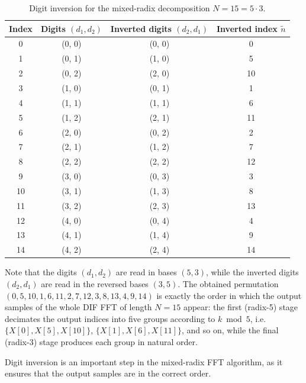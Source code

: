 \documentclass[a4paper,12pt, master]{etf}
\begin{document}
\begin{table}[H]
    \centering
    \begin{tabular}{|c|c|c|c|}
        \hline
        \textbf{Index} & \textbf{Digits $(d_1, d_2)$} & \textbf{Inverted digits $(d_2, d_1)$} & \textbf{Inverted index $\tilde{n}$} \\
        \hline
        0 & (0, 0) & (0, 0) & 0 \\
        \hline
        1 & (0, 1) & (1, 0) & 5 \\
        \hline
        2 & (0, 2) & (2, 0) & 10 \\
        \hline
        3 & (1, 0) & (0, 1) & 1 \\
        \hline
        4 & (1, 1) & (1, 1) & 6 \\
        \hline
        5 & (1, 2) & (2, 1) & 11 \\
        \hline
        6 & (2, 0) & (0, 2) & 2 \\
        \hline
        7 & (2, 1) & (1, 2) & 7 \\
        \hline
        8 & (2, 2) & (2, 2) & 12 \\
        \hline
        9 & (3, 0) & (0, 3) & 3 \\
        \hline
        10 & (3, 1) & (1, 3) & 8 \\
        \hline
        11 & (3, 2) & (2, 3) & 13 \\
        \hline
        12 & (4, 0) & (0, 4) & 4 \\
        \hline
        13 & (4, 1) & (1, 4) & 9 \\
        \hline
        14 & (4, 2) & (2, 4) & 14 \\
        \hline
    \end{tabular}
    \caption{Digit inversion for the mixed-radix decomposition $N = 15 = 5 \cdot 3$.}
    \label{tab:mixed_radix_digit_inversion}
\end{table}

Note that the digits $(d_1, d_2)$ are read in bases $(5, 3)$, while the inverted digits $(d_2, d_1)$ are read in the reversed bases $(3, 5)$. The obtained permutation $(0, 5, 10, 1, 6, 11, 2, 7, 12, 3, 8, 13, 4, 9, 14)$ is exactly the order in which the output samples of the whole DIF FFT of length $N = 15$ appear: the first (radix-5) stage decimates the output indices into five groups according to $k \bmod 5$, i.e. $\{X[0], X[5], X[10]\}$, $\{X[1], X[6], X[11]\}$, and so on, while the final (radix-3) stage produces each group in natural order.

Digit inversion is an important step in the mixed-radix FFT algorithm, as it ensures that the output samples are in the correct order.
\end{document}
